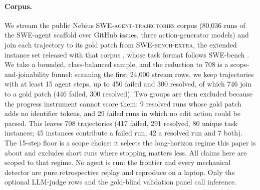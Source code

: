 \documentclass[sigconf,screen]{acmart}
\begin{document}
\paragraph{Corpus.} We stream the public Nebius \textsc{SWE-agent-trajectories} corpus
\cite{nebius2024trajectories} (80{,}036 runs of the SWE-agent scaffold \cite{yang2024sweagent} over
GitHub issues, three action-generator models) and join each trajectory to its gold patch from
\textsc{SWE-bench-extra}, the extended instance set released with that corpus
\cite{nebius2024trajectories}, whose task format follows SWE-bench \cite{jimenez2024swebench}. We
take a bounded, class-balanced sample, and the reduction to 708 is a
scope-and-joinability funnel: scanning the first 24{,}000 stream rows, we keep trajectories with at
least 15 agent steps, up to 450 failed and 300 resolved, of which 746 join to a gold patch (446
failed, 300 resolved). Two groups are then excluded because the progress instrument cannot score
them: 9 resolved runs whose gold patch adds no identifier tokens, and 29 failed runs in which no
edit action could be parsed. This leaves 708 trajectories (417 failed, 291 resolved, 80 unique
task instances; 45 instances contribute a failed run, 42 a resolved run and 7 both). The 15-step
floor is a scope choice: it
selects the long-horizon regime this paper is about and excludes short runs where stopping matters
less. All claims here are scoped to that regime. No agent is run: the frontier and every mechanical
detector are pure retrospective replay and reproduce on a laptop. Only the optional LLM-judge rows
and the gold-blind validation panel call inference.
\end{document}

